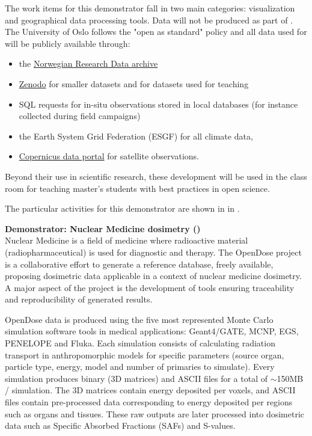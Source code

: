 The work items for this demonstrator fall in two main categories:
visualization and geographical data processing tools. Data will not be produced as part of \TheProject. The University of Oslo follows the "open as standard" policy and all data used for \TheProject will be publicly available through:
\begin{itemize}
\item the \href{https://archive.norstore.no/}{Norwegian Research Data archive}
\item \href{https://zenodo.org/}{Zenodo} for smaller datasets and for datasets used for teaching
\item SQL requests for in-situ observations stored in local databases (for instance collected during field campaigns)
\item the Earth System Grid Federation (ESGF) for all climate data,
\item \href{https://www.copernicus.eu/en/access-data}{Copernicus data portal} for satellite observations.
\end{itemize}


Beyond their use in scientific research, these development will be used in
the class room for teaching master's students with best practices in open
science.

The particular activities for this demonstrator are shown in
   in .

\medskip
\noindent\textbf{Demonstrator: Nuclear Medicine dosimetry ()}\label{sec:concept-demonstrators-opendose}\\
  Nuclear Medicine is a field of medicine where radioactive material
  (radiopharmaceutical) is used for diagnostic and therapy. The OpenDose
  project \cite{Chauvin2017} is a collaborative effort to generate a reference
  database, freely available, proposing dosimetric data applicable in a context
  of nuclear medicine dosimetry.  A major aspect of the project is the
  development of tools ensuring traceability and reproducibility of generated
  results.

  OpenDose data is produced using the five most represented Monte Carlo
  simulation software tools in medical applications: Geant4/GATE, MCNP, EGS, PENELOPE
  and Fluka. Each simulation consists of calculating radiation transport in
  anthropomorphic models for specific parameters (source organ, particle type,
  energy, model and number of primaries to simulate). Every simulation produces
  binary (3D matrices) and ASCII files for a total of $\sim$150MB / simulation.
  The 3D matrices contain energy deposited per voxels, and ASCII files contain
  pre-processed data corresponding to energy deposited per regions such as
  organs and tissues. These raw outputs are later processed into dosimetric
  data such as Specific Absorbed Fractions (SAFs) and S-values.


